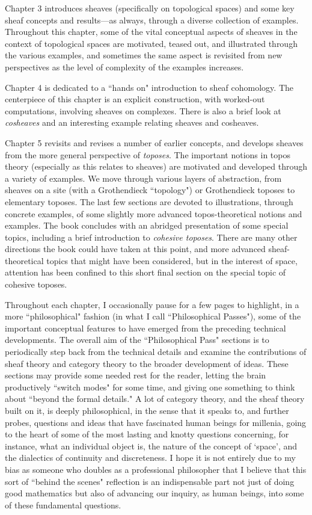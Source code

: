 \documentclass[a4paper]{book}
\theoremstyle{definition}
\theoremstyle{definition}
\theoremstyle{definition}
\theoremstyle{theorem}
\theoremstyle{definition}
\begin{document}
	Chapter 3 introduces sheaves (specifically on topological spaces) and some key sheaf concepts and results---as always, through a diverse collection of examples. Throughout this chapter, some of the vital conceptual aspects of sheaves in the context of topological spaces are motivated, teased out, and illustrated through the various examples, and sometimes the same aspect is revisited from new perspectives as the level of complexity of the examples increases. \par 
	Chapter 4 is dedicated to a ``hands on" introduction to sheaf cohomology. The centerpiece of this chapter is an explicit construction, with worked-out computations, involving sheaves on complexes. There is also a brief look at \textit{cosheaves} and an interesting example relating sheaves and cosheaves. \par 
	Chapter 5 revisits and revises a number of earlier concepts, and develops sheaves from the more general perspective of \textit{toposes}. The important notions in topos theory (especially as this relates to sheaves) are motivated and developed through a variety of examples. We move through various layers of abstraction, from sheaves on a site (with a Grothendieck ``topology") or Grothendieck toposes to elementary toposes. The last few sections are devoted to illustrations, through concrete examples, of some slightly more advanced topos-theoretical notions and examples. The book concludes with an abridged presentation of some special topics, including a brief introduction to \textit{cohesive toposes}. There are many other directions the book could have taken at this point, and more advanced sheaf-theoretical topics that might have been considered, but in the interest of space, attention has been confined to this short final section on the special topic of cohesive toposes. \par 
	Throughout each chapter, I occasionally pause for a few pages to highlight, in a more ``philosophical" fashion (in what I call ``Philosophical Passes"), some of the important conceptual features to have emerged from the preceding technical developments. The overall aim of the ``Philosophical Pass" sections is to periodically step back from the technical details and examine the contributions of sheaf theory and category theory to the broader development of ideas. These sections may provide some needed rest for the reader, letting the brain productively ``switch modes" for some time, and giving one something to think about ``beyond the formal details." A lot of category theory, and the sheaf theory built on it, is deeply philosophical, in the sense that it speaks to, and further probes, questions and ideas that have fascinated human beings for millenia, going to the heart of some of the most lasting and knotty questions concerning, for instance, what an individual object is, the nature of the concept of `space', and the dialectics of continuity and discreteness. I hope it is not entirely due to my bias as someone who doubles as a professional philosopher that I believe that this sort of ``behind the scenes" reflection is an indispensable part not just of doing good mathematics but also of advancing our inquiry, as human beings, into some of these fundamental questions. 
\end{document}
